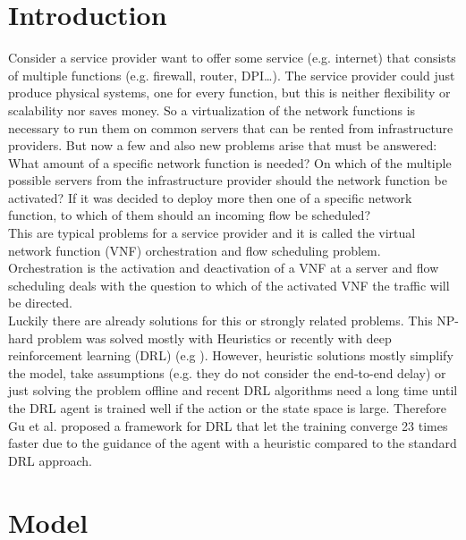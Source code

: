 \section{Introduction}%
\label{sec:introduction}
Consider a service provider want to offer some service (e.g. internet) that consists of multiple functions (e.g. firewall, router, DPI\dots). The service provider could just produce physical systems, one for every function, but this is neither flexibility or scalability nor saves money. So a virtualization of the network functions is necessary to run them on common servers that can be rented from infrastructure providers. But now a few and also new problems arise that must be answered: What amount of a specific network function is needed? On which of the multiple possible servers from the infrastructure provider should the network function be activated? If it was decided to deploy more then one of a specific network function, to which of them should an incoming flow be scheduled?\\
This are typical problems for a service provider and it is called the virtual network function (VNF) orchestration and flow scheduling problem. Orchestration is the activation and deactivation of a VNF at a server and flow scheduling deals with the question to which of the activated VNF the traffic will be directed.  \\
Luckily there are already solutions for this or strongly related problems. This NP-hard problem was solved mostly with Heuristics
or recently with deep reinforcement learning (DRL) (e.g \cite{Guz}). However, heuristic solutions mostly simplify the model, take assumptions (e.g. they do not consider the end-to-end delay) or just solving the problem offline and recent DRL algorithms need a long time until the DRL agent is trained well if the action or the state space is large. Therefore Gu et al. \cite{Gu} proposed a framework for DRL that let the training converge 23 times faster due to the guidance of the agent with a heuristic compared to the standard DRL approach.



\section{Model} %
\label{sec:model}

